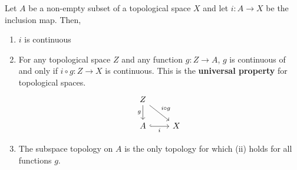 \begin{nlemma}
  Let $A$ be a non-empty subset of a topological space $X$ and let $i : A \to X$ be the inclusion map. Then,
  \begin{enumerate}
    \item $i$ is continuous
    \item For any topological space $Z$ and any function $g : Z \to A$, $g$ is continuous of and only if $i \circ g : Z \to X$ is continuous. This is the \textbf{universal property} for topological spaces.
      \[\begin{tikzcd}
  	Z \\ A & X
  	\arrow["{i \circ g}", from=1-1, to=2-2]
  	\arrow["i"', hook, from=2-1, to=2-2]
  	\arrow["g"', from=1-1, to=2-1]
  \end{tikzcd}\]
    \item The subspace topology on $A$ is the only topology for which (ii) holds for all functions $g$.
  \end{enumerate}
\end{nlemma}
